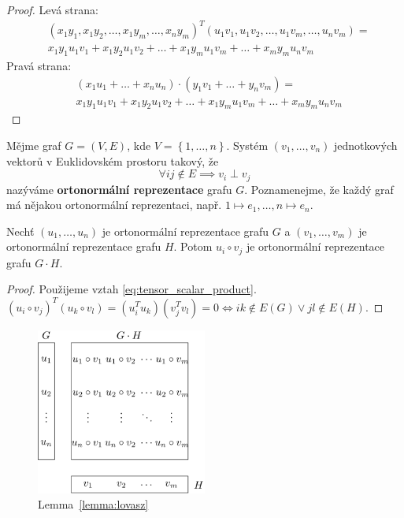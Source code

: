 \begin{proof}
    Levá strana:
    \begin{equation*}
        \begin{split}
        & \left(x_1 y_1, x_1 y_2, \dots, x_1 y_m, \dots, x_n y_m \right)^T \left( u_1 v_1, u_1 v_2, \dots, u_1 v_m, \dots, u_n v_m \right) = \\
        & x_1 y_1 u_1 v_1 + x_1 y_2 u_1 v_2 + \dots + x_1 y_m u_1 v_m + \dots + x_m y_m u_n v_m
        \end{split}
    \end{equation*}
    Pravá strana:
    \begin{equation*}
        \begin{split}
            & \left( x_1 u_1 + \dots + x_n u_n \right) \cdot \left( y_1 v_1 + \dots + y_n v_m \right) = \\
            & x_1 y_1 u_1 v_1 + x_1 y_2 u_1 v_2 + \dots + x_1 y_m u_1 v_m + \dots + x_m y_m u_n v_m
        \end{split}
    \end{equation*}
\end{proof}

Mějme graf $G = (V,E)$, kde $V = \left\{ 1, \dots, n \right\}$. Systém $\left( v_1, \dots, v_n \right)$ jednotkových vektorů v Euklidovském prostoru takový, že
$$
    \forall ij \notin E \implies v_i \perp v_j
$$
nazýváme \textbf{ortonormální reprezentace} grafu $G$. Poznamenejme, že každý graf má nějakou ortonormální reprezentaci, např. $1 \mapsto e_1, \dots, n \mapsto e_n$.

\begin{lm}\cite{lovasz}
    Nechť $\left( u_1, \dots, u_n \right)$ je ortonormální reprezentace grafu $G$ a $\left( v_1, \dots, v_m \right)$ je ortonormální reprezentace grafu $H$. Potom $u_i \circ v_j$ je ortonormální reprezentace grafu $G \cdot H$.
    \label{lemma:lovasz}
\end{lm}

\begin{proof}
    Použijeme vztah \ref{eq:tensor_scalar_product}. $\left( u_i \circ v_j \right)^T \left( u_k \circ v_l \right) = \left( u_i^T u_k \right) \left( v_j^T v_l \right) = 0 \iff ik \notin E(G) \vee jl \notin E(H)$.
\end{proof}

\begin{figure}[h!]
    \centering
    \includegraphics[width=0.5\textwidth]{img/shannon_lemma.png} 
    \caption{Lemma~\ref{lemma:lovasz}}
\end{figure}

